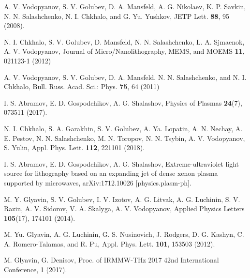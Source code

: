 \documentclass[aip, apl, amsmath,amssymb, reprint]{revtex4-1}
\begin{document}
\begin{thebibliography}{6}
A. V. Vodopyanov, S. V. Golubev, D. A. Mansfeld, A. G. Nikolaev, K. P. Savkin, N. N. Salashchenko, N. I. Chkhalo, and G. Yu. Yushkov, JETP Lett. \textbf{88}, 95 (2008).

N. I. Chkhalo, S. V. Golubev, D. Mansfeld, N. N. Salashchenko, L. A. Sjmaenok, A. V. Vodopyanov, Journal of Micro/Nanolithography, MEMS, and MOEMS \textbf{11}, 021123-1 (2012)

A. V. Vodopyanov, S. V. Golubev, D. A. Mansfeld, N. N. Salashchenko, and N. I. Chkhalo, Bull. Russ. Acad. Sci.: Phys. \textbf{75}, 64 (2011)

I. S. Abramov, E. D. Gospodchikov, A. G. Shalashov, Physics of Plasmas \textbf{24}(7), 073511 (2017).

 N. I. Chkhalo, S. A. Garakhin, S. V. Golubev, A. Ya. Lopatin, A. N. Nechay, A. E. Pestov, N. N. Salashchenko, M. N. Toropov, N. N. Tsybin, A. V. Vodopyanov,  S. Yulin, Appl. Phys. Lett. \textbf{112}, 221101 (2018).

I. S. Abramov, E. D. Gospodchikov, A. G. Shalashov, 
Extreme-ultraviolet light source for lithography based on an expanding jet of dense xenon plasma supported by microwaves,
arXiv:1712.10026 [physics.plasm-ph].

M. Y. Glyavin, S. V. Golubev, I. V. Izotov, A. G. Litvak, A. G. Luchinin, S. V. Razin, A. V. Sidorov, V. A. Skalyga, A. V. Vodopyanov, Applied Physics Letters \textbf{105}(17), 174101 (2014).

 M. Yu. Glyavin, A. G. Luchinin, G. S. Nusinovich, J. Rodgers, D. G. Kashyn, C. A. Romero-Talamas, and R. Pu, Appl. Phys. Lett. \textbf{101}, 153503 (2012).
 
 M. Glyavin, G. Denisov, Proc. of IRMMW-THz 2017 42nd International Conference, 1 (2017).


\end{thebibliography}
\end{document}
